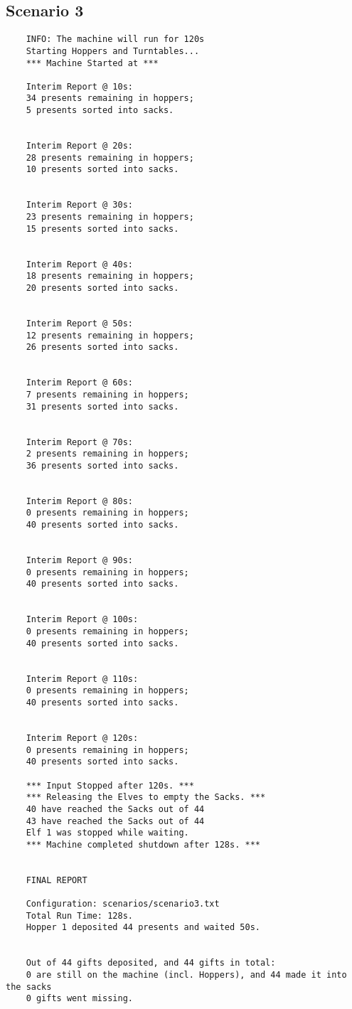 \documentclass[a4paper,12pt]{article}
\begin{document}
    \subsection{Scenario 3}
    \begin{verbatim}
    INFO: The machine will run for 120s
    Starting Hoppers and Turntables...
    *** Machine Started at ***

    Interim Report @ 10s:
    34 presents remaining in hoppers;
    5 presents sorted into sacks.


    Interim Report @ 20s:
    28 presents remaining in hoppers;
    10 presents sorted into sacks.


    Interim Report @ 30s:
    23 presents remaining in hoppers;
    15 presents sorted into sacks.


    Interim Report @ 40s:
    18 presents remaining in hoppers;
    20 presents sorted into sacks.


    Interim Report @ 50s:
    12 presents remaining in hoppers;
    26 presents sorted into sacks.


    Interim Report @ 60s:
    7 presents remaining in hoppers;
    31 presents sorted into sacks.


    Interim Report @ 70s:
    2 presents remaining in hoppers;
    36 presents sorted into sacks.


    Interim Report @ 80s:
    0 presents remaining in hoppers;
    40 presents sorted into sacks.


    Interim Report @ 90s:
    0 presents remaining in hoppers;
    40 presents sorted into sacks.


    Interim Report @ 100s:
    0 presents remaining in hoppers;
    40 presents sorted into sacks.


    Interim Report @ 110s:
    0 presents remaining in hoppers;
    40 presents sorted into sacks.


    Interim Report @ 120s:
    0 presents remaining in hoppers;
    40 presents sorted into sacks.

    *** Input Stopped after 120s. ***
    *** Releasing the Elves to empty the Sacks. ***
    40 have reached the Sacks out of 44
    43 have reached the Sacks out of 44
    Elf 1 was stopped while waiting.
    *** Machine completed shutdown after 128s. ***


    FINAL REPORT

    Configuration: scenarios/scenario3.txt
    Total Run Time: 128s.
    Hopper 1 deposited 44 presents and waited 50s.


    Out of 44 gifts deposited, and 44 gifts in total:
    0 are still on the machine (incl. Hoppers), and 44 made it into the sacks
    0 gifts went missing.
    \end{verbatim}
\end{document}
